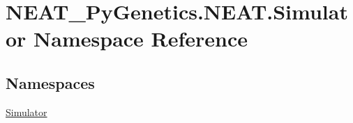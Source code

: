 \hypertarget{namespaceNEAT__PyGenetics_1_1NEAT_1_1Simulator}{}\section{N\+E\+A\+T\+\_\+\+Py\+Genetics.\+N\+E\+A\+T.\+Simulator Namespace Reference}
\label{namespaceNEAT__PyGenetics_1_1NEAT_1_1Simulator}
\subsection*{Namespaces}
\begin{DoxyCompactItemize}
\item 
 \hyperlink{namespaceNEAT__PyGenetics_1_1NEAT_1_1Simulator_1_1Simulator}{Simulator}
\end{DoxyCompactItemize}
